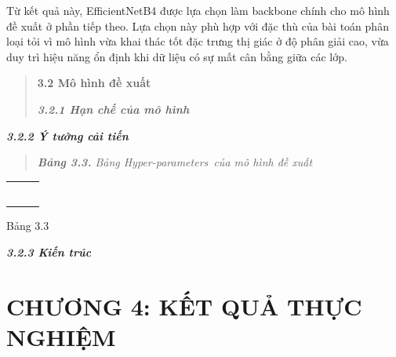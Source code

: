 \documentclass[
]{article}
\newcounter{none} %
\begin{document}
Từ kết quả này, EfficientNetB4 được lựa chọn làm backbone chính cho mô
hình đề xuất ở phần tiếp theo. Lựa chọn này phù hợp với đặc thù của bài
toán phân loại tỏi vì mô hình vừa khai thác tốt đặc trưng thị giác ở độ
phân giải cao, vừa duy trì hiệu năng ổn định khi dữ liệu có sự mất cân
bằng giữa các lớp.

\begin{quote}
\protect{}\label{_Toc232112030}{}\textbf{3.2 Mô hình đề
xuất}

\protect{}\label{_Toc232112031}{}\emph{\textbf{3.2.1 Hạn
chế của mô hình}}
\end{quote}

\protect{}\label{_Toc232112032}{}\emph{\textbf{3.2.2 Ý
tưởng cải tiến}}

\begin{quote}
\emph{\textbf{Bảng 3.3.} Bảng Hyper-parameters~của mô hình đề xuất}
\end{quote}

{\def\LTcaptype{none} %
\begin{longtable}[]{@{}
  >{\raggedright\arraybackslash}p{}
  >{\centering\arraybackslash}p{}
  >{\centering\arraybackslash}p{}@{}}
\toprule\noalign{}
\begin{minipage}[b]{\linewidth}\raggedright
\end{minipage} & \begin{minipage}[b]{\linewidth}\centering
\end{minipage} & \begin{minipage}[b]{\linewidth}\centering
\end{minipage} \\
\midrule\noalign{}
\endhead
\bottomrule\noalign{}
\endlastfoot
& & \\
& & \\
& & \\
& & \\
& & \\
& & \\
\end{longtable}
}

Bảng 3.3

\protect{}\label{_Toc232112033}{}\emph{\textbf{3.2.3 Kiến
trúc}}

\section{CHƯƠNG 4: KẾT QUẢ THỰC
NGHIỆM}\label{chux1b0ux1a1ng-4-kux1ebft-quux1ea3-thux1ef1c-nghiux1ec7m}
\end{document}
